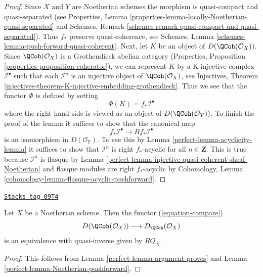 \begin{proof}

Since $X$ and $Y$ are Noetherian schemes the morphism is quasi-compact
and quasi-separated (see
Properties, Lemma \ref{properties-lemma-locally-Noetherian-quasi-separated}
and
Schemes, Remark \ref{schemes-remark-quasi-compact-and-quasi-separated}).
Thus $f_*$ preserve quasi-coherence, see
Schemes, Lemma \ref{schemes-lemma-push-forward-quasi-coherent}.
Next, let $K$ be an object of $D(\QCoh(\mathcal{O}_X))$.
Since $\QCoh(\mathcal{O}_X)$ is a Grothendieck abelian category
(Properties, Proposition \ref{properties-proposition-coherator}), we can
represent $K$ by a K-injective complex $\mathcal{I}^\bullet$
such that each $\mathcal{I}^n$ is an injective object of
$\QCoh(\mathcal{O}_X)$, see
Injectives, Theorem
\ref{injectives-theorem-K-injective-embedding-grothendieck}.
Thus we see that the functor $\Phi$ is defined by setting
$$
\Phi(K) = f_*\mathcal{I}^\bullet
$$
where the right hand side is viewed as an object of
$D(\QCoh(\mathcal{O}_Y))$. To finish the proof of the lemma
it suffices to show that the canonical map
$$
f_*\mathcal{I}^\bullet \longrightarrow Rf_*\mathcal{I}^\bullet
$$
is an isomorphism in $D(\mathcal{O}_Y)$. To see this by
Lemma \ref{perfect-lemma-acyclicity-lemma}
it suffices to show that $\mathcal{I}^n$ is right
$f_*$-acyclic for all $n \in \mathbf{Z}$.
This is true because $\mathcal{I}^n$ is flasque by
Lemma \ref{perfect-lemma-injective-quasi-coherent-sheaf-Noetherian}
and flasque modules are right $f_*$-acyclic by
Cohomology, Lemma \ref{cohomology-lemma-flasque-acyclic-pushforward}.
\end{proof}

\begin{proposition}[Noetherian]
\label{perfect-proposition-Noetherian}
\href{https://stacks.math.columbia.edu/tag/09T4}{\texttt{Stacks tag 09T4}}

Let $X$ be a Noetherian scheme. Then the functor (\ref{equation-compare})
$$
D(\QCoh(\mathcal{O}_X))
\longrightarrow
D_\QCoh(\mathcal{O}_X)
$$
is an equivalence with quasi-inverse given by $RQ_X$.
\end{proposition}

\begin{proof}

This follows from Lemma \ref{perfect-lemma-argument-proves} and
Lemma \ref{perfect-lemma-Noetherian-pushforward}.
\end{proof}

